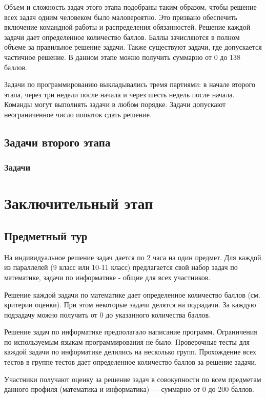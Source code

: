 \documentclass[a4paper,12pt,oneside]{book}
\begin{document}
Объем и сложность задач этого этапа подобраны таким образом,
чтобы решение всех задач одним человеком было маловероятно. Это
призвано обеспечить включение командной работы и распределения
обязанностей. Решение каждой задачи дает определенное количество
баллов. Баллы зачисляются в полном объеме за
правильное решение задачи.
Также существуют задачи, где допускается частичное решение.
В данном этапе можно получить суммарно от
0 до 138 баллов.

Задачи по программированию выкладывались
тремя партиями: в начале второго этапа, через три недели после начала
и через шесть недель после начала.
Команды могут выполнять задачи в любом порядке. Задачи допускают
неограниченное число попыток сдать решение.

\chapter{Задачи второго этапа}
\section{Задачи}



\part{Заключительный этап}

\clearpage
\chapter{Предметный тур}

На индивидуальное решение задач дается по 2 часа на один предмет.
Для каждой из параллелей (9 класс или 10-11 класс) предлагается свой
набор задач по математике, задачи по информатике - общие для всех
участников.

Решение каждой задачи по математике дает определенное количество
баллов (см. критерии оценки). При этом некоторые задачи делятся на
подзадачи. За каждую подзадачу можно получить от 0 до указанного
количества баллов.

Решение задач по информатике предполагало написание программ.
Ограничения по используемым языкам программирования не было.
Проверочные тесты для каждой задачи по информатике делились на
несколько групп. Прохождение всех тестов в группе тестов дает
определенное количество баллов за решение задачи.

Участники получают оценку за решение задач в совокупности по
всем предметам данного профиля (математика и информатика) ---
суммарно от 0 до 200 баллов.
\end{document}
